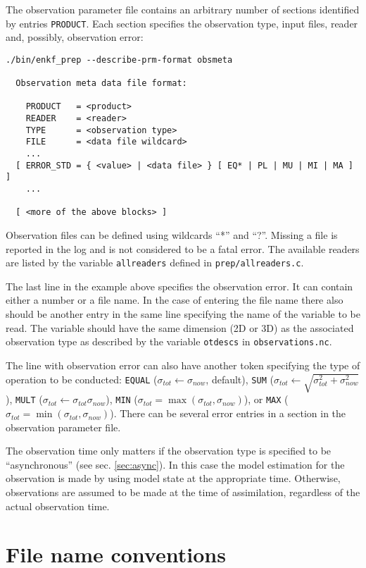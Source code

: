 \documentclass[11pt]{report}
\begin{document}
The observation parameter file contains an arbitrary number of sections identified by entries \verb|PRODUCT|.
Each section specifies the observation type, input files, reader and, possibly, observation error:
\begin{Verbatim}[frame=single,fontsize=\footnotesize]
./bin/enkf_prep --describe-prm-format obsmeta

  Observation meta data file format:

    PRODUCT   = <product>
    READER    = <reader>
    TYPE      = <observation type>
    FILE      = <data file wildcard> 
    ...
  [ ERROR_STD = { <value> | <data file> } [ EQ* | PL | MU | MI | MA ] ]
    ...

  [ <more of the above blocks> ]
\end{Verbatim}
Observation files can be defined using wildcards ``*'' and ``?''.
Missing a file is reported in the log and is not considered to be a fatal error.
The available readers are listed by the variable \verb|allreaders| defined in \verb|prep/allreaders.c|.

The last line in the example above specifies the observation error.
It can contain either a number or a file name.
In the case of entering the file name there also should be another entry in the same line specifying the name of the variable to be read.
The variable should have the same dimension (2D or 3D) as the associated observation type as described by the variable \verb|otdescs| in \verb|observations.nc|.

The line with observation error can also have another token specifying the type of operation to be conducted: \verb|EQUAL| ($\sigma_{tot} \leftarrow \sigma_{now}$, default), \verb|SUM| ($\sigma_{tot} \leftarrow \sqrt{\sigma_{tot}^2 + \sigma_{now}^2}$), \verb|MULT| ($\sigma_{tot} \leftarrow \sigma_{tot} \sigma_{now}$), \verb|MIN| ($\sigma_{tot} = \max(\sigma_{tot}, \sigma_{now})$), or \verb|MAX| ($\sigma_{tot} = \min(\sigma_{tot}, \sigma_{now})$).
There can be several error entries in a section in the observation parameter file.

The observation time only matters if the observation type is specified to be ``asynchronous'' (see sec. \ref{sec:async}).
In this case the model estimation for the observation is made by using model state at the appropriate time.
Otherwise, observations are assumed to be made at the time of assimilation, regardless of the actual observation time.

\section{File name conventions}
\end{document}
